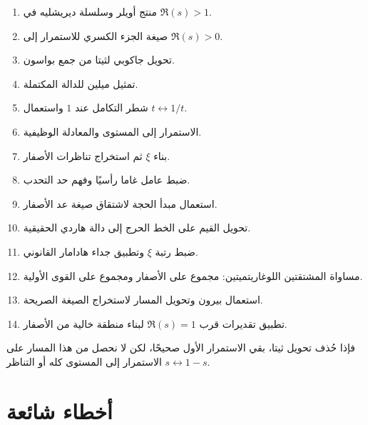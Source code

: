\begin{enumerate}
  \item منتج أويلر وسلسلة ديريشليه في \(\Re(s)>1\).
  \item صيغة الجزء الكسري للاستمرار إلى \(\Re(s)>0\).
  \item تحويل جاكوبي لثيتا من جمع بواسون.
  \item تمثيل ميلين للدالة المكتملة.
  \item شطر التكامل عند \(1\) واستعمال \(t\leftrightarrow1/t\).
  \item الاستمرار إلى المستوى والمعادلة الوظيفية.
  \item بناء \(\xi\) ثم استخراج تناظرات الأصفار.
  \item ضبط عامل غاما رأسيًا وفهم حد التحدب.
  \item استعمال مبدأ الحجة لاشتقاق صيغة عد الأصفار.
  \item تحويل القيم على الخط الحرج إلى دالة هاردي الحقيقية.
  \item ضبط رتبة \(\xi\) وتطبيق جداء هادامار القانوني.
  \item مساواة المشتقتين اللوغاريتميتين: مجموع على الأصفار ومجموع على
  القوى الأولية.
  \item استعمال بيرون وتحويل المسار لاستخراج الصيغة الصريحة.
  \item تطبيق تقديرات قرب \(\Re(s)=1\) لبناء منطقة خالية من الأصفار.
\end{enumerate}

فإذا حُذف تحويل ثيتا، بقي الاستمرار الأول صحيحًا، لكن لا نحصل من هذا
المسار على الاستمرار إلى المستوى كله أو التناظر \(s\leftrightarrow1-s\).

\section{أخطاء شائعة}

